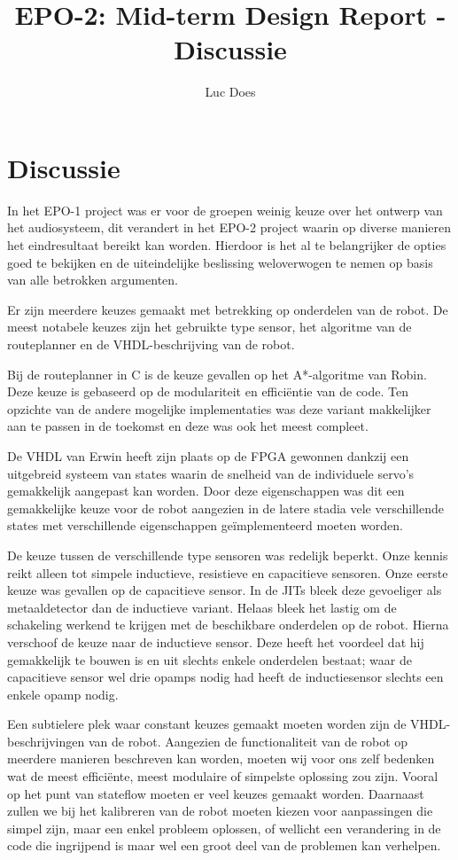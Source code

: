 \documentclass{report}
\title{EPO-2: Mid-term Design Report - Discussie}
\author{Luc Does}
\begin{document}
\chapter{Discussie}
\label{ch:discussie}

In het EPO-1 project was er voor de groepen weinig keuze over het ontwerp van het audiosysteem, dit verandert in het EPO-2 project waarin op diverse manieren het eindresultaat bereikt kan worden. Hierdoor is het al te belangrijker de opties goed te bekijken en de uiteindelijke beslissing weloverwogen te nemen op basis van alle betrokken argumenten. \newline

Er zijn meerdere keuzes gemaakt met betrekking op onderdelen van de robot. De meest notabele keuzes zijn het gebruikte type sensor, het algoritme van de routeplanner en de VHDL-beschrijving van de robot. \newline

Bij de routeplanner in C is de keuze  gevallen op het A*-algoritme van Robin. Deze keuze is gebaseerd op de modulariteit en efficiëntie van de code. Ten opzichte van de andere mogelijke implementaties was deze variant makkelijker aan te passen in de toekomst en deze was ook het meest compleet. \newline

De VHDL van Erwin heeft zijn plaats op de FPGA gewonnen dankzij een uitgebreid systeem van states waarin de snelheid van de individuele servo's gemakkelijk aangepast kan worden. Door deze eigenschappen was dit een gemakkelijke keuze voor de robot aangezien in de latere stadia vele verschillende states met verschillende eigenschappen geïmplementeerd moeten worden. \newline

De keuze tussen de verschillende type sensoren was redelijk beperkt. Onze kennis reikt alleen tot simpele inductieve, resistieve en capacitieve sensoren. Onze eerste keuze was gevallen op de capacitieve sensor. In de JITs bleek deze gevoeliger als metaaldetector dan de inductieve variant. Helaas bleek het lastig om de schakeling werkend te krijgen met de beschikbare onderdelen op de robot. Hierna verschoof de keuze naar de inductieve sensor. Deze heeft het voordeel dat hij gemakkelijk te bouwen is en uit slechts enkele onderdelen bestaat; waar de capacitieve sensor wel drie opamps nodig had heeft de inductiesensor slechts een enkele opamp nodig. \newline

Een subtielere plek waar constant keuzes gemaakt moeten worden zijn de VHDL-beschrijvingen van de robot. Aangezien de functionaliteit van de robot op meerdere manieren beschreven kan worden, moeten wij voor ons zelf bedenken wat de meest efficiënte, meest modulaire of simpelste oplossing zou zijn. Vooral op het punt van stateflow moeten er veel keuzes gemaakt worden. Daarnaast zullen we bij het kalibreren van de robot moeten kiezen voor aanpassingen die simpel zijn, maar een enkel probleem oplossen, of wellicht een verandering in de code die ingrijpend is maar wel een groot deel van de problemen kan verhelpen.
\end{document}
